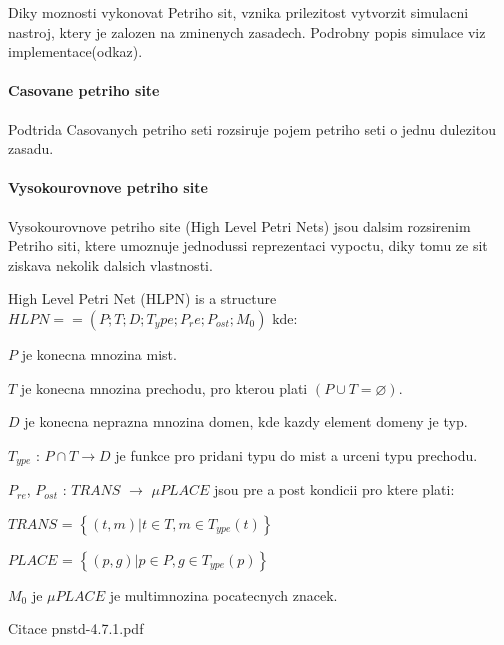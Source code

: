 Diky moznosti vykonovat Petriho sit, vznika prilezitost vytvorzit simulacni nastroj, ktery je zalozen na zminenych zasadech. Podrobny popis simulace viz implementace(odkaz).

\paragraph{Casovane petriho site}
Podtrida Casovanych petriho seti rozsiruje pojem petriho seti o jednu dulezitou zasadu. 
\paragraph{Vysokourovnove petriho site}
Vysokourovnove petriho site (High Level Petri Nets) jsou dalsim rozsirenim Petriho siti, ktere umoznuje jednodussi reprezentaci vypoctu, diky tomu ze sit ziskava nekolik dalsich vlastnosti. 

High Level Petri Net (HLPN) is a structure $HLPN = = \left( P; T; D; T_ype; P_re; P_{ost}; M_0\right) $ kde: 

\begin{itemize}
  \item $P$ je konecna mnozina mist. \\
  \item $T$ je konecna mnozina prechodu, pro kterou plati $\left(P \cup T = \varnothing\right)$. \\
  \item $D$ je konecna neprazna mnozina domen, kde kazdy element domeny je typ. \\ %
  \item $T_{ype}$ : $P \cap T \rightarrow D$ je funkce pro pridani typu do mist a urceni typu prechodu.
  \item $P_{re}$, $P_{ost}$ : $TRANS$ $\rightarrow$ $\mu PLACE$ jsou pre a post kondicii pro ktere plati: \\
  \begin{center}
    \item $TRANS$ = $\left\{\left(t, m\right) | t \in T, m \in T_{ype} \left( t \right)\right\}$ \\
    \item $PLACE$ = $\left\{\left(p, g\right) | p \in P, g \in T_{ype} \left( p \right)\right\}$ \\
  \end{center}
  
  \item $M_0$ je $\mu PLACE$ je multimnozina pocatecnych znacek.
\end{itemize}  
Citace pnstd-4.7.1.pdf
